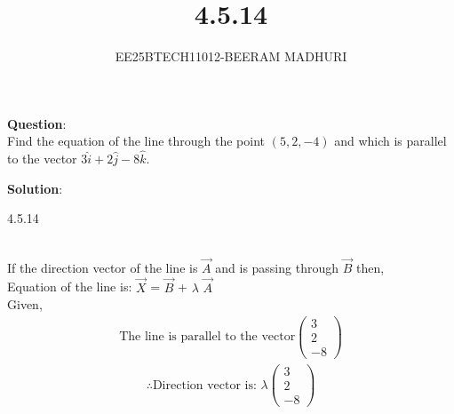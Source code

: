 \documentclass[journal]{IEEEtran}
\begin{document}

\vspace{3cm}

\title{4.5.14}
\author{EE25BTECH11012-BEERAM MADHURI}
{\let\newpage\relax\maketitle}

\renewcommand{\thefigure}{\theenumi}
\renewcommand{\thetable}{\theenumi}
\setlength{\intextsep}{10pt} %


\renewcommand{\thetable}{\theenumi}


\textbf{Question}:\\
 Find the equation of the line through the point $(5, 2, -4)$ and which is parallel to the vector $3\hat{i} + 2\hat{j} - 8\hat{k}$.

\textbf{Solution}:\\
\begin{table}[h!]
    \centering
    
    \caption{4.5.14}
    \label{table 4.5.14}
\end{table}\\
\text If the direction vector of the line is $\vec{A}$ and is passing through $\vec{B}$ then, \\
Equation of the line is: $\vec{X}$ = $\vec{B}$ + $\lambda$ $\vec{A}$\\
Given,
\begin{align}
\text{The line is parallel to the vector}
\begin{pmatrix}3 \\2 \\-8\end{pmatrix}
\end{align}
\begin{align}
\therefore \text{Direction vector is: } \lambda\begin{pmatrix}
3 \\
2 \\
-8
\end{pmatrix}
\end{align}
\end{document}
